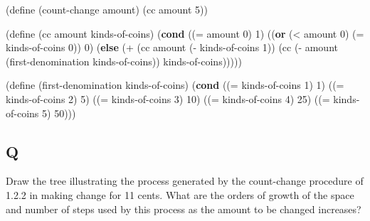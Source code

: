 \documentclass[
]{article}
\newenvironment{Shaded}{}{}
\newcommand{\DecValTok}[1]{\textcolor[rgb]{0.25,0.63,0.44}{#1}}
\newcommand{\ExtensionTok}[1]{#1}
\newcommand{\FunctionTok}[1]{\textcolor[rgb]{0.02,0.16,0.49}{#1}}
\newcommand{\KeywordTok}[1]{\textcolor[rgb]{0.00,0.44,0.13}{\textbf{#1}}}
\newcommand{\NormalTok}[1]{#1}
\newcommand{\OperatorTok}[1]{\textcolor[rgb]{0.40,0.40,0.40}{#1}}
\begin{document}
\hypertarget{count-change}{%
\label{count-change}}%
\begin{Shaded}
\begin{Highlighting}[numbers=left,,]
\NormalTok{(}\ExtensionTok{define}\FunctionTok{ }\NormalTok{(count{-}change amount)}
\NormalTok{  (cc amount }\DecValTok{5}\NormalTok{))}

\NormalTok{(}\ExtensionTok{define}\FunctionTok{ }\NormalTok{(cc amount kinds{-}of{-}coins)}
\NormalTok{  (}\KeywordTok{cond}\NormalTok{ ((}\OperatorTok{=}\NormalTok{ amount }\DecValTok{0}\NormalTok{) }\DecValTok{1}\NormalTok{)}
\NormalTok{        ((}\KeywordTok{or}\NormalTok{ (}\OperatorTok{\textless{}}\NormalTok{ amount }\DecValTok{0}\NormalTok{)}
\NormalTok{             (}\OperatorTok{=}\NormalTok{ kinds{-}of{-}coins }\DecValTok{0}\NormalTok{))}
         \DecValTok{0}\NormalTok{)}
\NormalTok{        (}\KeywordTok{else}
\NormalTok{         (}\OperatorTok{+}\NormalTok{ (cc amount (}\OperatorTok{{-}}\NormalTok{ kinds{-}of{-}coins }\DecValTok{1}\NormalTok{))}
\NormalTok{            (cc (}\OperatorTok{{-}}\NormalTok{ amount (first{-}denomination}
\NormalTok{                           kinds{-}of{-}coins))}
\NormalTok{                kinds{-}of{-}coins)))))}

\NormalTok{(}\ExtensionTok{define}\FunctionTok{ }\NormalTok{(first{-}denomination kinds{-}of{-}coins)}
\NormalTok{  (}\KeywordTok{cond}\NormalTok{ ((}\OperatorTok{=}\NormalTok{ kinds{-}of{-}coins }\DecValTok{1}\NormalTok{) }\DecValTok{1}\NormalTok{)}
\NormalTok{        ((}\OperatorTok{=}\NormalTok{ kinds{-}of{-}coins }\DecValTok{2}\NormalTok{) }\DecValTok{5}\NormalTok{)}
\NormalTok{        ((}\OperatorTok{=}\NormalTok{ kinds{-}of{-}coins }\DecValTok{3}\NormalTok{) }\DecValTok{10}\NormalTok{)}
\NormalTok{        ((}\OperatorTok{=}\NormalTok{ kinds{-}of{-}coins }\DecValTok{4}\NormalTok{) }\DecValTok{25}\NormalTok{)}
\NormalTok{        ((}\OperatorTok{=}\NormalTok{ kinds{-}of{-}coins }\DecValTok{5}\NormalTok{) }\DecValTok{50}\NormalTok{)))}
\end{Highlighting}
\end{Shaded}

\hypertarget{q-13}{%
\subsection{Q}\label{q-13}}

Draw the tree illustrating the process generated by the count-change
procedure of 1.2.2 in making change for 11 cents. What are the orders of
growth of the space and number of steps used by this process as the
amount to be changed increases?
\end{document}
